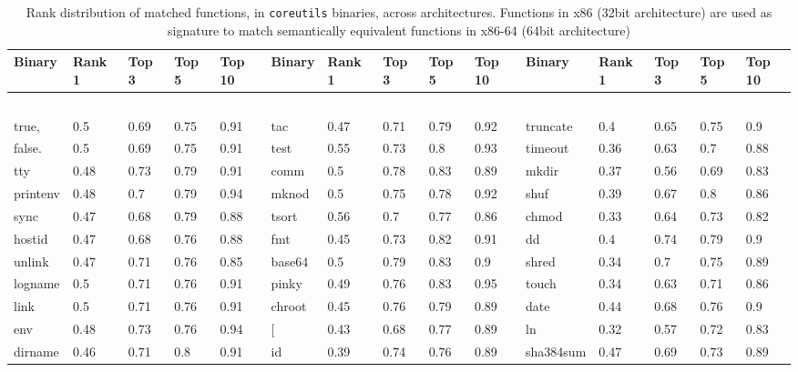 


\begin{table*}[h!]
	\begin{center}
		\caption{Rank distribution of matched functions, in \texttt{coreutils} binaries, across architectures. Functions in x86 (32bit architecture) are used as signature to match semantically  equivalent functions in x86-64 (64bit architecture)\\}
		\label{tab:x86_x64_core}
		\scriptsize


\begin{tabular}{ | l | l | l | l | l || l | l | l | l | l || l | l | l | l | l | }
\hline
	Binary & Rank 1 & Top 3 & Top 5 & Top 10 & Binary & Rank 1 & Top 3 & Top 5 & Top 10 & Binary & Rank 1 & Top 3 & Top 5 & Top 10 \\ \hline
	\  & \  & \  & \  & \  & \  & \  & \  & \  & \  & \  & \  & \  & \  & \   \\ \hline
	true, & 0.5 & 0.69 & 0.75 & 0.91 & tac & 0.47 & 0.71 & 0.79 & 0.92 & truncate & 0.4 & 0.65 & 0.75 & 0.9 \\ \hline
	false. & 0.5 & 0.69 & 0.75 & 0.91 & test & 0.55 & 0.73 & 0.8 & 0.93 & timeout & 0.36 & 0.63 & 0.7 & 0.88 \\ \hline
	tty & 0.48 & 0.73 & 0.79 & 0.91 & comm & 0.5 & 0.78 & 0.83 & 0.89 & mkdir & 0.37 & 0.56 & 0.69 & 0.83 \\ \hline
	printenv & 0.48 & 0.7 & 0.79 & 0.94 & mknod & 0.5 & 0.75 & 0.78 & 0.92 & shuf & 0.39 & 0.67 & 0.8 & 0.86 \\ \hline
	sync & 0.47 & 0.68 & 0.79 & 0.88 & tsort & 0.56 & 0.7 & 0.77 & 0.86 & chmod & 0.33 & 0.64 & 0.73 & 0.82 \\ \hline
	hostid & 0.47 & 0.68 & 0.76 & 0.88 & fmt & 0.45 & 0.73 & 0.82 & 0.91 & dd & 0.4 & 0.74 & 0.79 & 0.9 \\ \hline
	unlink & 0.47 & 0.71 & 0.76 & 0.85 & base64 & 0.5 & 0.79 & 0.83 & 0.9 & shred & 0.34 & 0.7 & 0.75 & 0.89 \\ \hline
	logname & 0.5 & 0.71 & 0.76 & 0.91 & pinky & 0.49 & 0.76 & 0.83 & 0.95 & touch & 0.34 & 0.63 & 0.71 & 0.86 \\ \hline
	link & 0.5 & 0.71 & 0.76 & 0.91 & chroot & 0.45 & 0.76 & 0.79 & 0.89 & date & 0.44 & 0.68 & 0.76 & 0.9 \\ \hline
	env & 0.48 & 0.73 & 0.76 & 0.94 & [ & 0.43 & 0.68 & 0.77 & 0.89 & ln & 0.32 & 0.57 & 0.72 & 0.83 \\ \hline
	dirname & 0.46 & 0.71 & 0.8 & 0.91 & id & 0.39 & 0.74 & 0.76 & 0.89 & sha384sum & 0.47 & 0.69 & 0.73 & 0.89 \\ \hline

\end{tabular}
\end{center}
\end{table*}
